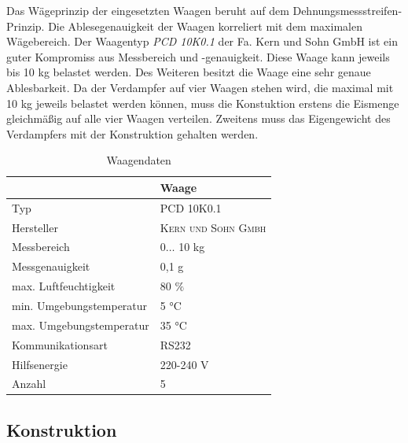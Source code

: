 Das Wägeprinzip der eingesetzten Waagen beruht auf dem Dehnungsmessstreifen-Prinzip. Die Ablesegenauigkeit der Waagen korreliert mit dem maximalen Wägebereich. Der Waagentyp \textit{PCD 10K0.1} der Fa. Kern und Sohn GmbH ist ein guter Kompromiss aus Messbereich und -genauigkeit. Diese Waage kann  jeweils  bis 10 kg belastet  werden. Des Weiteren besitzt die Waage eine sehr genaue Ablesbarkeit. Da der Verdampfer auf vier Waagen stehen wird, die maximal mit 10 kg jeweils belastet werden können, muss die Konstuktion erstens die Eismenge gleichmäßig auf alle vier Waagen verteilen. Zweitens muss das Eigengewicht des Verdampfers mit der Konstruktion gehalten werden. 


 
\begin{table}[htb]
\centering
\caption{Waagendaten}\vspace{6pt}
\begin{tabular}{ll}
\hline 
 & \textbf{Waage}  \\ 
\hline 
\hline 
Typ & PCD 10K0.1 \\ 
\hline 
Hersteller & \textsc{Kern und Sohn Gmbh} \\ 
\hline 
Messbereich & 0$ \dots$ 10 kg \\ 
\hline 
Messgenauigkeit &  0,1 g\\ 
\hline 
max. Luftfeuchtigkeit & 80 $\%$\\
\hline
min. Umgebungstemperatur & 5 °C\\
\hline
max. Umgebungstemperatur & 35 °C\\
\hline
Kommunikationsart & RS232 \\ 
\hline 
Hilfsenergie & 220-240  V   \\ 
\hline
Anzahl & 5 \\ 
\hline 
\hline 
\end{tabular} 
\label{tab:Waagendaten}
\end{table}



\subsection{Konstruktion}
\label{subsec:Waagen-Konstruktion}


